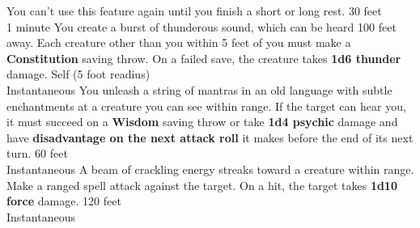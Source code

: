 \documentclass{article}
\begin{document}
\begin{center}
{    You can’t use this feature again until you finish a short or long rest.}
    {30 feet\\ 1 minute}%
    {You create a burst of thunderous sound, which can be heard 100 feet away. Each creature other than you within 5 feet of you must make a \textbf{Constitution} saving throw. On a failed save, the creature takes \textbf{1d6 thunder} damage.}
    {Self (5 foot readius)\\Instantaneous}%
    {You unleash a string of mantras in an old language with subtle enchantments at a creature you can see within range. If the target can hear you, it must succeed on a \textbf{Wisdom} saving throw or take \textbf{1d4 psychic} damage and have \textbf{disadvantage on the next attack roll} it makes before the end of its next turn.}
    {60 feet\\Instantaneous}%
    {A beam of crackling energy streaks toward a creature within range. Make a ranged spell attack against the target. On a hit, the target takes \textbf{1d10 force} damage.}
    {120 feet\\Instantaneous}%
    
\removespace    
    

\end{center}
\end{document}

